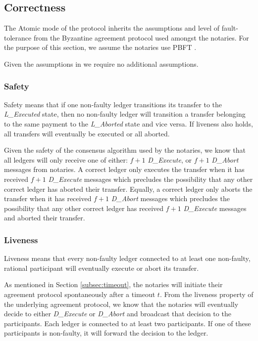\documentclass[letterpaper,twocolumn,10pt]{article}
\begin{document}
\subsection{Correctness}

The Atomic mode of the protocol inherits the assumptions and level of fault-tolerance from the Byzantine agreement protocol used amongst the notaries. For the purpose of this section, we assume the notaries use PBFT \cite{castro1999practical}.

Given the assumptions in \cite{castro1999practical} we require no additional assumptions.

\subsubsection{Safety}

Safety means that if one non-faulty ledger transitions its transfer to the \textit{L\_Executed} state, then no non-faulty ledger will transition a transfer belonging to the same payment to the \textit{L\_Aborted} state and vice versa. If liveness also holds, all transfers will eventually be executed or all aborted.

Given the safety of the consensus algorithm used by the notaries, 
we know that all ledgers will only receive one of either: $f + 1$ \textit{D\_Execute}, or $f + 1$ \textit{D\_Abort} messages from notaries. A correct ledger only executes the transfer when it has received $f + 1$ \textit{D\_Execute} messages which precludes the possibility that any other correct ledger has aborted their transfer. Equally, a correct ledger only aborts the transfer when it has received $f + 1$ \textit{D\_Abort} messages which precludes the possibility that any other correct ledger has received $f + 1$ \textit{D\_Execute} messages and aborted their transfer.

\subsubsection{Liveness}

Liveness means that every non-faulty ledger connected to at least one non-faulty, rational participant will eventually execute or abort its transfer.

As mentioned in Section \ref{subsec:timeout}, the notaries will initiate their agreement protocol spontaneously after a timeout $t$. From the liveness property of the underlying agreement protocol, we know that the notaries will eventually decide to either \textit{D\_Execute} or \textit{D\_Abort} and broadcast that decision to the participants. Each ledger is connected to at least two participants. If one of these participants is non-faulty, it will forward the decision to the ledger.
\end{document}
